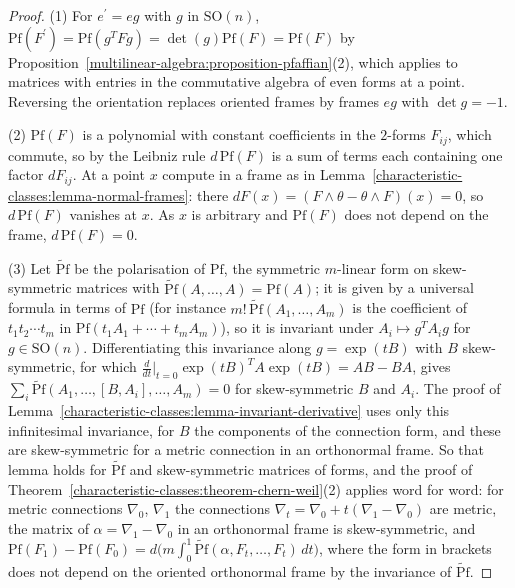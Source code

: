 \begin{proof}
(1) For $e^{\prime} = eg$ with $g$ in $\mathrm{SO}(n)$, $\mathrm{Pf}(F^{\prime}) = \mathrm{Pf}(g^TFg) = \det(g)\mathrm{Pf}(F) = \mathrm{Pf}(F)$ by
Proposition~\ref{multilinear-algebra:proposition-pfaffian}(2), which applies to matrices with entries in the commutative algebra of even forms at a point. Reversing the orientation
replaces oriented frames by frames $eg$ with $\det g = -1$.

(2) $\mathrm{Pf}(F)$ is a polynomial with constant coefficients in the $2$-forms $F_{ij}$, which commute, so by the Leibniz rule $d\,\mathrm{Pf}(F)$ is a sum of terms each containing one
factor $dF_{ij}$. At a point $x$ compute in a frame as in Lemma~\ref{characteristic-classes:lemma-normal-frames}: there $dF(x) = (F \wedge \theta - \theta \wedge F)(x) = 0$, so
$d\,\mathrm{Pf}(F)$ vanishes at $x$. As $x$ is arbitrary and $\mathrm{Pf}(F)$ does not depend on the frame, $d\,\mathrm{Pf}(F) = 0$.

(3) Let $\widetilde{\mathrm{Pf}}$ be the polarisation of $\mathrm{Pf}$, the symmetric $m$-linear form on skew-symmetric matrices with $\widetilde{\mathrm{Pf}}(A, \ldots, A) = \mathrm{Pf}(A)$; it is
given by a universal formula in terms of $\mathrm{Pf}$ (for instance $m!\,\widetilde{\mathrm{Pf}}(A_1, \ldots, A_m)$ is the coefficient of $t_1t_2 \cdots t_m$ in $\mathrm{Pf}(t_1A_1 + \cdots + t_mA_m)$), so it is
invariant under $A_i \mapsto g^TA_ig$ for $g \in \mathrm{SO}(n)$. Differentiating this invariance along $g = \exp(tB)$ with $B$ skew-symmetric, for which
$\frac{d}{dt}\big|_{t=0}\exp(tB)^TA\exp(tB) = AB - BA$, gives $\sum_i\widetilde{\mathrm{Pf}}(A_1, \ldots, [B, A_i], \ldots, A_m) = 0$ for skew-symmetric $B$ and $A_i$. The proof of
Lemma~\ref{characteristic-classes:lemma-invariant-derivative} uses only this infinitesimal invariance, for $B$ the components of the connection form, and these are skew-symmetric for a
metric connection in an orthonormal frame. So that lemma holds for $\widetilde{\mathrm{Pf}}$ and skew-symmetric matrices of forms, and the proof of
Theorem~\ref{characteristic-classes:theorem-chern-weil}(2) applies word for word: for metric connections $\nabla_0$, $\nabla_1$ the connections $\nabla_t = \nabla_0 + t(\nabla_1 - \nabla_0)$
are metric, the matrix of $\alpha = \nabla_1 - \nabla_0$ in an orthonormal frame is skew-symmetric, and
$\mathrm{Pf}(F_1) - \mathrm{Pf}(F_0) = d\bigl(m\int_0^1\widetilde{\mathrm{Pf}}(\alpha, F_t, \ldots, F_t)\,dt\bigr)$, where the form in brackets does not depend on the oriented orthonormal frame by the
invariance of $\widetilde{\mathrm{Pf}}$.


\end{proof}
